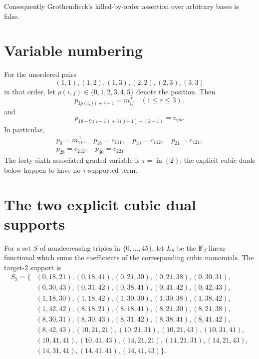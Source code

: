 \documentclass[11pt]{article}
\theoremstyle{remark}
\newcommand{\F}{\mathbf F}
\begin{document}
Consequently Grothendieck's killed-by-order assertion over arbitrary bases is
false.

\appendix

\section{Variable numbering}\label{app:numbering}

For the unordered pairs
\[
 (1,1),(1,2),(1,3),(2,2),(2,3),(3,3)
\]
in that order, let \(\rho(i,j)\in\{0,1,2,3,4,5\}\) denote the position.
Then
\[
 p_{3\rho(i,j)+r-1}=m_{ij}^{\,r}
 \quad(1\le r\le3),
\]
and
\[
 p_{18+9(i-1)+3(j-1)+(k-1)}=c_{ijk}.
\]
In particular,
\[
\begin{gathered}
p_0=m_{11}^{\,1},\quad p_{18}=c_{111},\quad
p_{19}=c_{112},\quad p_{21}=c_{121},\\
p_{28}=c_{212},\quad p_{30}=c_{221}.
\end{gathered}
\]
The forty-sixth associated-graded variable is \(\tau=\operatorname{in}(2)\);
the explicit cubic duals below happen to have no \(\tau\)-supported term.

\section{The two explicit cubic dual supports}\label{app:duals}

For a set \(S\) of nondecreasing triples in \(\{0,\ldots,45\}\), let
\(L_S\) be the \(\F_2\)-linear functional which sums the coefficients of the
corresponding cubic monomials.  The target-\(2\) support is
\begingroup\small
\begin{align*}
S_2=\{&
(0,18,21),(0,18,41),(0,21,30),(0,21,38),(0,30,31),\\
&(0,30,43),(0,31,42),(0,38,41),(0,41,42),(0,42,43),\\
&(1,18,30),(1,18,42),(1,30,30),(1,30,38),(1,38,42),\\
&(1,42,42),(8,18,21),(8,18,41),(8,21,30),(8,21,38),\\
&(8,30,31),(8,30,43),(8,31,42),(8,38,41),(8,41,42),\\
&(8,42,43),(10,21,21),(10,21,31),(10,21,43),(10,31,41),\\
&(10,41,41),(10,41,43),(14,21,21),(14,21,31),(14,21,43),\\
&(14,31,41),(14,41,41),(14,41,43)\}.
\end{align*}
\endgroup
\end{document}
